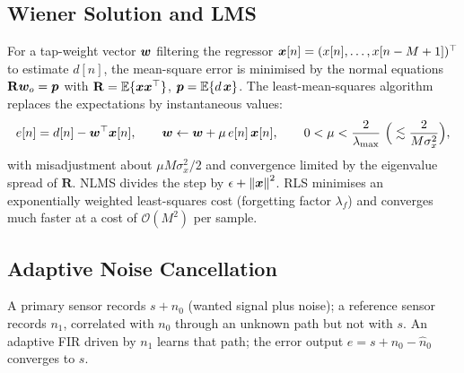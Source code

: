 \documentclass[11pt,a4paper]{article}
\begin{document}
\subsection{Wiener Solution and LMS}
For a tap-weight vector $\bm{w}$ filtering the regressor $\bm{x}[n]=(x[n],\dots,x[n-M+1])^\top$ to estimate $d[n]$, the mean-square error is minimised by the normal equations $\mathbf R\bm{w}_o=\bm{p}$ with $\mathbf R=\mathbb{E}\{\bm{x}\bm{x}^\top\}$, $\bm{p}=\mathbb{E}\{d\,\bm{x}\}$. The least-mean-squares algorithm replaces the expectations by instantaneous values:
\begin{equation}
  e[n]=d[n]-\vect w^\top\vect x[n],\qquad \vect w\leftarrow\vect w+\mu\,e[n]\,\vect x[n],\qquad 0<\mu<\frac2{\lambda_{\max}}\ \Big(\lesssim\frac2{M\sigma_x^2}\Big),
  \label{eq:lms}
\end{equation}
with misadjustment about $\mu M\sigma_x^2/2$ and convergence limited by the eigenvalue spread of $\mathbf R$. NLMS divides the step by $\epsilon+\left\lVert\bm{x}\right\rVert^2$. RLS minimises an exponentially weighted least-squares cost (forgetting factor $\lambda_f$) and converges much faster at a cost of $\mathcal O(M^2)$ per sample.

\subsection{Adaptive Noise Cancellation}
A primary sensor records $s+n_0$ (wanted signal plus noise); a reference sensor records $n_1$, correlated with $n_0$ through an unknown path but not with $s$. An adaptive FIR driven by $n_1$ learns that path; the error output $e=s+n_0-\hat n_0$ converges to $s$.
\end{document}
